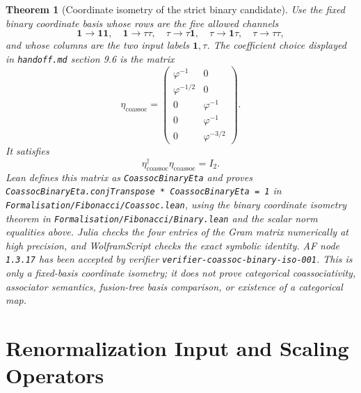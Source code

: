 \documentclass[11pt]{article}
\newtheorem{theorem}[definition]{Theorem}
\begin{document}
\begin{theorem}[Coordinate isometry of the strict binary candidate]
Use the fixed binary coordinate basis whose rows are the five allowed
channels
\[
\mathbf 1\to\mathbf 1\mathbf 1,\quad
\mathbf 1\to\tau\tau,\quad
\tau\to\tau\mathbf 1,\quad
\tau\to\mathbf 1\tau,\quad
\tau\to\tau\tau,
\]
and whose columns are the two input labels \(\mathbf 1,\tau\).  The
coefficient choice displayed in \texttt{handoff.md} section 9.6 is the matrix
\[
\eta_{\mathrm{coassoc}}=
\begin{pmatrix}
\varphi^{-1} & 0\\
\varphi^{-1/2} & 0\\
0 & \varphi^{-1}\\
0 & \varphi^{-1}\\
0 & \varphi^{-3/2}
\end{pmatrix}.
\]
It satisfies
\[
\eta_{\mathrm{coassoc}}^{\dagger}\eta_{\mathrm{coassoc}}=I_2.
\]
Lean defines this matrix as \texttt{CoassocBinaryEta} and proves
\texttt{CoassocBinaryEta.conjTranspose * CoassocBinaryEta = 1} in
\texttt{Formalisation/Fibonacci/Coassoc.lean}, using the binary coordinate
isometry theorem in \texttt{Formalisation/Fibonacci/Binary.lean} and the
scalar norm equalities above. Julia checks the four entries of the Gram
matrix numerically at high precision, and WolframScript checks the exact
symbolic identity. AF node \texttt{1.3.17} has been accepted by verifier
\texttt{verifier-coassoc-binary-iso-001}. This is only a fixed-basis
coordinate isometry; it does not prove categorical coassociativity,
associator semantics, fusion-tree basis comparison, or existence of a
categorical map.
\end{theorem}

\section{Renormalization Input and Scaling Operators}
\end{document}
